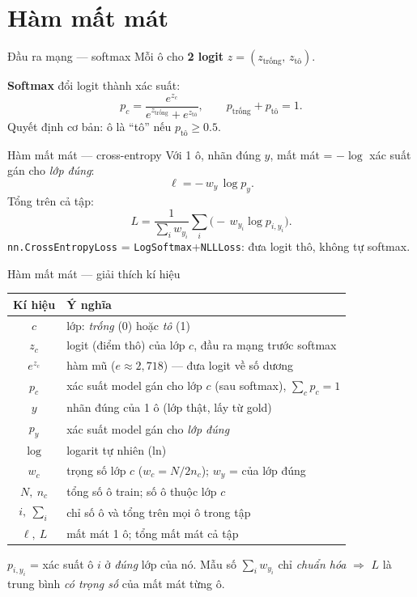 \documentclass{beamer}
\newcommand{\hl}[1]{\textbf{#1}}
\begin{document}
\section{Hàm mất mát}

\begin{frame}{Đầu ra mạng --- softmax}
Mỗi ô cho \hl{2 logit} $z=(z_{\text{trống}},\,z_{\text{tô}})$.

\textbf{Softmax} đổi logit thành xác suất:
\[
p_c=\frac{e^{z_c}}{e^{z_{\text{trống}}}+e^{z_{\text{tô}}}},
\qquad p_{\text{trống}}+p_{\text{tô}}=1 .
\]
\vspace{0.2cm}
Quyết định cơ bản: ô là ``tô'' nếu $p_{\text{tô}}\ge 0.5$.
\end{frame}

\begin{frame}{Hàm mất mát --- cross-entropy}
Với 1 ô, nhãn đúng $y$, mất mát = $-\log$ xác suất gán cho \emph{lớp đúng}:
\[
\ell = -\,w_{y}\,\log p_{y}.
\]
Tổng trên cả tập:
\[
L=\frac{1}{\sum_i w_{y_i}}\sum_i \big(-\,w_{y_i}\log p_{i,y_i}\big).
\]
\vspace{0.1cm}
{\footnotesize \texttt{nn.CrossEntropyLoss} = \texttt{LogSoftmax}+\texttt{NLLLoss}: đưa logit thô, không tự softmax.}
\end{frame}

\begin{frame}{Hàm mất mát --- giải thích kí hiệu}
\scriptsize
\begin{center}
\begin{tabular}{|c|l|}
\hline
\textbf{Kí hiệu} & \textbf{Ý nghĩa} \\
\hline
$c$ & lớp: \emph{trống} (0) hoặc \emph{tô} (1) \\
$z_c$ & logit (điểm thô) của lớp $c$, đầu ra mạng trước softmax \\
$e^{z_c}$ & hàm mũ ($e\approx 2{,}718$) --- đưa logit về số dương \\
$p_c$ & xác suất model gán cho lớp $c$ (sau softmax), $\sum_c p_c=1$ \\
$y$ & nhãn đúng của 1 ô (lớp thật, lấy từ gold) \\
$p_y$ & xác suất model gán cho \emph{lớp đúng} \\
$\log$ & logarit tự nhiên (ln) \\
$w_c$ & trọng số lớp $c$ ($w_c=N/2n_c$); $w_y$ = của lớp đúng \\
$N,\ n_c$ & tổng số ô train; số ô thuộc lớp $c$ \\
$i,\ \sum_i$ & chỉ số ô và tổng trên mọi ô trong tập \\
$\ell,\ L$ & mất mát 1 ô; tổng mất mát cả tập \\
\hline
\end{tabular}
\end{center}
\vspace{0.15cm}
{\scriptsize $p_{i,y_i}$ = xác suất ô $i$ ở \emph{đúng} lớp của nó. Mẫu số $\sum_i w_{y_i}$ chỉ \emph{chuẩn hóa} $\Rightarrow$ $L$ là trung bình \emph{có trọng số} của mất mát từng ô.}
\end{frame}
\end{document}
